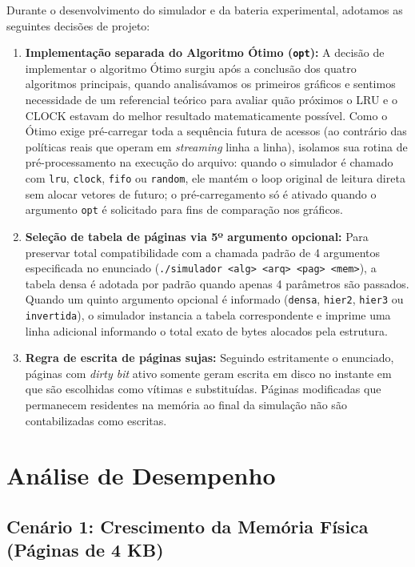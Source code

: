\documentclass[12pt,a4paper]{article}
\begin{document}
Durante o desenvolvimento do simulador e da bateria experimental, adotamos as seguintes decisões de projeto:
\begin{enumerate}
    \item \textbf{Implementação separada do Algoritmo Ótimo (\texttt{opt}):} A decisão de implementar o algoritmo Ótimo surgiu após a conclusão dos quatro algoritmos principais, quando analisávamos os primeiros gráficos e sentimos necessidade de um referencial teórico para avaliar quão próximos o LRU e o CLOCK estavam do melhor resultado matematicamente possível. Como o Ótimo exige pré-carregar toda a sequência futura de acessos (ao contrário das políticas reais que operam em \textit{streaming} linha a linha), isolamos sua rotina de pré-processamento na execução do arquivo: quando o simulador é chamado com \texttt{lru}, \texttt{clock}, \texttt{fifo} ou \texttt{random}, ele mantém o loop original de leitura direta sem alocar vetores de futuro; o pré-carregamento só é ativado quando o argumento \texttt{opt} é solicitado para fins de comparação nos gráficos.
    \item \textbf{Seleção de tabela de páginas via 5º argumento opcional:} Para preservar total compatibilidade com a chamada padrão de 4 argumentos especificada no enunciado (\texttt{./simulador <alg> <arq> <pag> <mem>}), a tabela densa é adotada por padrão quando apenas 4 parâmetros são passados. Quando um quinto argumento opcional é informado (\texttt{densa}, \texttt{hier2}, \texttt{hier3} ou \texttt{invertida}), o simulador instancia a tabela correspondente e imprime uma linha adicional informando o total exato de bytes alocados pela estrutura.
    \item \textbf{Regra de escrita de páginas sujas:} Seguindo estritamente o enunciado, páginas com \textit{dirty bit} ativo somente geram escrita em disco no instante em que são escolhidas como vítimas e substituídas. Páginas modificadas que permanecem residentes na memória ao final da simulação não são contabilizadas como escritas.
\end{enumerate}

\section{Análise de Desempenho}

\subsection{Cenário 1: Crescimento da Memória Física (Páginas de 4 KB)}
\end{document}
